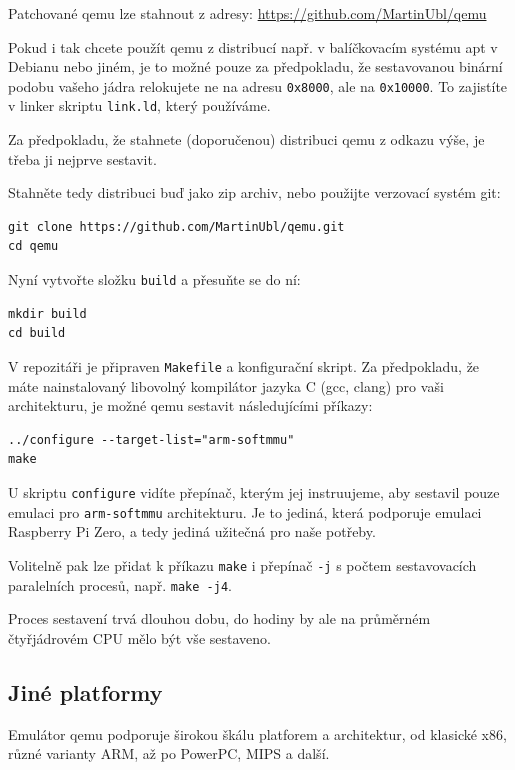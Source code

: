 \documentclass{article}
\begin{document}
Patchované qemu lze stahnout z adresy: \url{https://github.com/MartinUbl/qemu}

Pokud i tak chcete použít qemu z distribucí např. v balíčkovacím systému apt v Debianu nebo jiném, je to možné pouze za předpokladu, že sestavovanou binární podobu vašeho jádra relokujete ne na adresu {\tt 0x8000}, ale na {\tt 0x10000}. To zajistíte v linker skriptu {\tt link.ld}, který používáme.

Za předpokladu, že stahnete (doporučenou) distribuci qemu z odkazu výše, je třeba ji nejprve sestavit.

Stahněte tedy distribuci buď jako zip archiv, nebo použijte verzovací systém git:

\begin{verbatim}
git clone https://github.com/MartinUbl/qemu.git
cd qemu
\end{verbatim}

Nyní vytvořte složku {\tt build} a přesuňte se do ní:

\begin{verbatim}
mkdir build
cd build
\end{verbatim}

V repozitáři je připraven {\tt Makefile} a konfigurační skript. Za předpokladu, že máte nainstalovaný libovolný kompilátor jazyka C (gcc, clang) pro vaši architekturu, je možné qemu sestavit následujícími příkazy:

\begin{verbatim}
../configure --target-list="arm-softmmu"
make
\end{verbatim}

U skriptu {\tt configure} vidíte přepínač, kterým jej instruujeme, aby sestavil pouze emulaci pro {\tt arm-softmmu} architekturu. Je to jediná, která podporuje emulaci Raspberry Pi Zero, a tedy jediná užitečná pro naše potřeby.

Volitelně pak lze přidat k příkazu {\tt make} i přepínač {\tt -j} s počtem sestavovacích paralelních procesů, např. {\tt make -j4}.

Proces sestavení trvá dlouhou dobu, do hodiny by ale na průměrném čtyřjádrovém CPU mělo být vše sestaveno.

\subsection{Jiné platformy}

Emulátor qemu podporuje širokou škálu platforem a architektur, od klasické x86, různé varianty ARM, až po PowerPC, MIPS a další.
\end{document}
